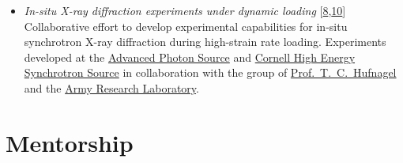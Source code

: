 \documentclass[a4paper,10pt, oneside]{article}
\begin{document}
\begin{itemize}[wide, labelwidth=!, labelindent=-1em]
\begin{itemize}[wide, labelwidth=!, labelindent=0em]
			\item \textit{In-situ X-ray diffraction experiments under dynamic loading} [\hyperref[jdbm2018]{8},\hyperref[rsi2014]{10}] \\
			Collaborative effort to develop experimental capabilities for in-situ synchrotron X-ray diffraction during high-strain rate loading. Experiments developed at the \href{https://www.aps.anl.gov/}{Advanced Photon Source} and \href{https://www.chess.cornell.edu/}{Cornell High Energy Synchrotron Source} in collaboration with the group of \href{https://engineering.jhu.edu/materials/faculty/todd-hufnagel/}{Prof.~T.~C.~Hufnagel} and the \href{https://www.arl.army.mil/}{Army Research Laboratory}.
		\end{itemize}
	\end{itemize}
	
	\section*{{Mentorship}}
\end{document}
